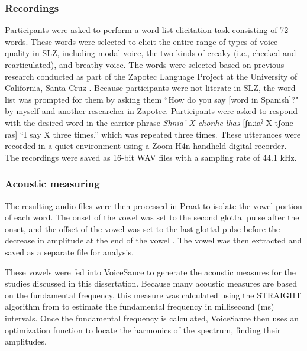 \subsubsection{Recordings} \label{sec:recordings} 
Participants were asked to perform a word list elicitation task consisting of 72 words. These words were selected to elicit the entire range of types of voice quality in SLZ, including modal voice, the two kinds of creaky (i.e., checked and rearticulated), and breathy voice. The words were selected based on previous research conducted as part of the Zapotec Language Project at the University of California, Santa Cruz \citep{ZapotecLanguageProject}. 
Because participants were not literate in SLZ, the word list was prompted for them by asking them ``How do you say [word in Spanish]?" by myself and another researcher in Zapotec. Participants were asked to respond with the desired word in the carrier phrase \textit{Shnia' X chonhe lhas} [ʃnːiaˀ X tʃone ɾas] ``I say X three times.'' which was repeated three times. These utterances were recorded in a quiet environment using a Zoom H4n handheld digital recorder. The recordings were saved as 16-bit WAV files with a sampling rate of 44.1 kHz.

\subsubsection{Acoustic measuring} \label{sec:acoustics}

The resulting audio files were then processed in Praat to isolate the vowel portion of each word. The onset of the vowel was set to the second glottal pulse after the onset, and the offset of the vowel was set to the last glottal pulse before the decrease in amplitude at the end of the vowel \citep{garellekAcousticDiscriminabilityComplex2020}. The vowel was then extracted and saved as a separate file for analysis.

These vowels were fed into VoiceSauce \citep{shueVoiceSauceProgramVoice2011} to generate the acoustic measures for the studies discussed in this dissertation. Because many acoustic measures are based on the fundamental frequency, this measure was calculated using the STRAIGHT algorithm from \citep{kawaharaInstantaneousfrequencybasedPitchExtraction1998} to estimate the fundamental frequency in millisecond (ms) intervals. Once the fundamental frequency is calculated, VoiceSauce then uses an optimization function to locate the harmonics of the spectrum, finding their amplitudes.

